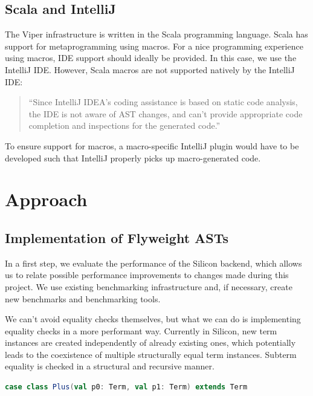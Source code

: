 \documentclass[11pt]{article}
\begin{document}
    \subsection{Scala and IntelliJ} \label{background:scala}

    The Viper infrastructure is written in the Scala programming language.
    Scala has support for metaprogramming using macros. For a nice programming experience
    using macros, IDE support should ideally be provided. In this case, we use the IntelliJ IDE.
    However, Scala macros are not supported natively by the IntelliJ IDE:
    \begin{quote}
        ``Since IntelliJ IDEA’s coding assistance is based on static code analysis,
        the IDE is not aware of AST changes, and can’t provide appropriate code
        completion and inspections for the generated code.'' \cite{intellij}
    \end{quote}

    To ensure support for macros, a macro-specific IntelliJ plugin would have to be developed such that
    IntelliJ properly picks up macro-generated code.

    \section{Approach} \label{approach}

    \subsection{Implementation of Flyweight ASTs} \label{approach:flyweight}

    In a first step, we evaluate the performance of the Silicon backend,
    which allows us to relate possible performance improvements to 
    changes made during this project. We use existing benchmarking infrastructure 
    and, if necessary, create new benchmarks and benchmarking tools.

    We can't avoid equality checks themselves, but what we can do is implementing
    equality checks in a more performant way. Currently in Silicon, new term instances are
    created independently of already existing ones, which potentially leads 
    to the coexistence of multiple structurally equal term instances. Subterm equality is checked in a
    structural and recursive manner.

\begin{lstlisting}[language=Scala, caption={Simplification of how term instances currently are
    implemented. Because \texttt{Plus} is defined as a case class, the compiler automatically
    generates code for recursive structural equality checking.}]
case class Plus(val p0: Term, val p1: Term) extends Term
\end{lstlisting}
        
\end{document}
